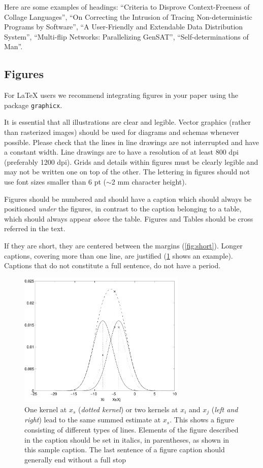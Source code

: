 \documentclass[runningheads]{llncs}
\begin{document}
Here are some examples of headings: 
``Criteria to Disprove Context-Freeness of Collage Languages'', ``On Correcting the Intrusion of Tracing Non-deterministic Programs by Software'', ``A User-Friendly and Extendable Data Distribution System'', ``Multi-flip Networks: Parallelizing GenSAT'', ``Self-determinations of Man''.


\subsection{Figures}
\label{sect:figures}
For \LaTeX{} users we recommend integrating figures in your paper using the package \texttt{graphicx}.

It is essential that all illustrations are clear and legible. 
Vector graphics (rather than rasterized images) should be used for diagrams and schemas whenever possible. 
Please check that the lines in line drawings are not interrupted and have a constant width. 
Line drawings are to have a resolution of at least 800 dpi (preferably 1200 dpi).
Grids and details within figures must be clearly legible and may not be written one on top of the other. 
The lettering in figures should not use font sizes smaller than 6 pt ($\sim$2 mm character height). 

Figures should be numbered and should have a caption which should always be positioned \emph{under} the figures, in contrast to the caption belonging to a table, which should always appear \emph{above} the table.
Figures and Tables should be cross referred in the text.

If they are short, they are centered between the margins (\cf \cref{fig:short}). 
Longer captions, covering more than one line, are justified (\cref{fig:example} shows an example). 
Captions that do not constitute a full sentence, do not have a period.


\begin{figure}[tb]
  \centering
  \includegraphics[height=6.5cm]{eijkel2}
  \caption{One kernel at $x_s$ (\emph{dotted kernel}) or two kernels at $x_i$ and $x_j$ (\emph{left and right}) lead to the same summed estimate at $x_s$.
    This shows a figure consisting of different types of lines.
    Elements of the figure described in the caption should be set in italics, in parentheses, as shown in this sample caption. 
    The last sentence of a figure caption should generally end without a full stop
  }
  \label{fig:example}
\end{figure}
\end{document}
